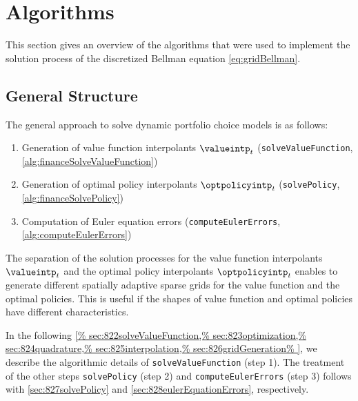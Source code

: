 \section{Algorithms}
\label{sec:82algorithms}


\noindent
This section gives an overview of the algorithms that
were used to implement the solution process of
the discretized Bellman equation \eqref{eq:gridBellman}.



\subsection{General Structure}
\label{sec:821generalStructure}

The general approach to solve dynamic portfolio choice models is as follows:
\begin{enumerate}
  \item
  Generation of value function interpolants $\valueintp_t$
  (\texttt{solveValueFunction}, \cref{alg:financeSolveValueFunction})
  
  \item
  Generation of optimal policy interpolants $\optpolicyintp_t$
  (\texttt{solvePolicy}, \cref{alg:financeSolvePolicy})
  
  \item
  Computation of Euler equation errors
  (\texttt{computeEulerErrors}, \cref{alg:computeEulerErrors})
\end{enumerate}
The separation of the solution processes for
the value function interpolants $\valueintp_t$
and the optimal policy interpolants $\optpolicyintp_t$
enables to generate different spatially adaptive sparse grids
for the value function and the optimal policies.
This is useful if the shapes of value function and optimal policies
have different characteristics.

In the following \cref{%
  sec:822solveValueFunction,%
  sec:823optimization,%
  sec:824quadrature,%
  sec:825interpolation,%
  sec:826gridGeneration%
}, we describe the algorithmic details of
\texttt{solveValueFunction} (step 1).
The treatment of the other steps \texttt{solvePolicy} (step 2) and
\texttt{computeEulerErrors} (step 3) follows with
\cref{sec:827solvePolicy} and \cref{sec:828eulerEquationErrors},
respectively.


